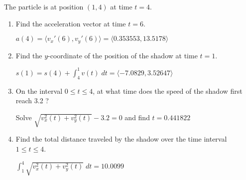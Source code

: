 \documentclass[11pt,answers]{exam}
\begin{document}
The particle is at position $(1,4)$ at time $t=4$.
\begin{enumerate}
\item Find the acceleration vector at time $t=6$.

$a(4) = \langle v_x'(6),v_y'(6) \rangle = \langle 0.353553, 13.5178 \rangle$

\item Find the $y$-coordinate of the position of
the shadow at time $t=1$.

$s(1) = s(4) + \displaystyle \int_4^1 v(t) \; dt = \langle -7.0829, 3.52647 \rangle$

\item On the interval $0 \leq t \leq 4$, at what
time does the speed of the shadow first reach 3.2 ?

Solve $\sqrt{v_x^2(t)+v_y^2(t)}-3.2 = 0$ and find $t = 0.441822$

\item Find the total distance traveled by the shadow
over the time interval $1 \leq t \leq 4$.

$\displaystyle \int_1^4 \sqrt{v_x^2(t)+v_y^2(t)} \; dt = 10.0099$

\end{enumerate}
\end{document}
